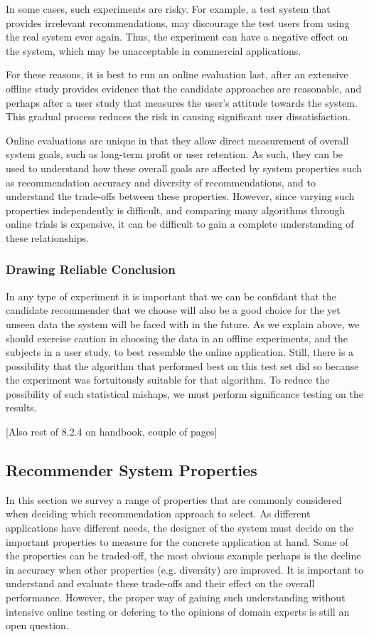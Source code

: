 In some cases, such experiments are risky. For example, a test system that provides irrelevant recommendations, may discourage the test users from using the real system ever again. Thus, the experiment can have a negative effect on the system, which may be unacceptable in commercial applications.

For these reasons, it is best to run an online evaluation last, after an extensive offline study provides evidence that the candidate approaches are reasonable, and perhaps after a user study that measures the user’s attitude towards the system. This gradual process reduces the risk in causing significant user dissatisfaction.

Online evaluations are unique in that they allow direct measurement of overall system goals, such as long-term profit or user retention. As such, they can be used to understand how these overall goals are affected by system properties such as recommendation accuracy and diversity of recommendations, and to understand the trade-offs between these properties. However, since varying such properties independently is difficult, and comparing many algorithms through online trials is expensive, it can be difficult to gain a complete understanding of these relationships.

\subsubsection{Drawing Reliable Conclusion}

In any type of experiment it is important that we can be confidant that the candidate recommender that we choose will also be a good choice for the yet unseen data the system will be faced with in the future. As we explain above, we should exercise caution in choosing the data in an offline experiments, and the subjects in a user study, to best resemble the online application. Still, there is a possibility that the algorithm that performed best on this test set did so because the experiment was fortuitously suitable for that algorithm. To reduce the possibility of such statistical mishaps, we must perform significance testing on the results.

[Also rest of 8.2.4 on handbook, couple of pages]

\subsection{Recommender System Properties}

In this section we survey a range of properties that are commonly considered when deciding which recommendation approach to select. As different applications have different needs, the designer of the system must decide on the important properties to measure for the concrete application at hand. Some of the properties can be traded-off, the most obvious example perhaps is the decline in accuracy when other properties (e.g. diversity) are improved. It is important to understand and evaluate these trade-offs and their effect on the overall performance. However, the proper way of gaining such understanding without intensive online testing or defering to the opinions of domain experts is still an open question.

